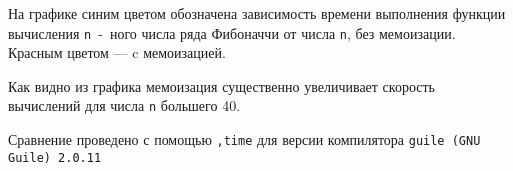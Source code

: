     На графике синим цветом обозначена зависимость времени выполнения функции вычисления \verb,n,~-~ного числа ряда Фибоначчи от числа \verb,n,, без мемоизации.
    Красным цветом --- c мемоизацией.

    Как видно из графика мемоизация существенно увеличивает скорость вычислений для числа \verb,n, большего 40.

    Сравнение проведено с помощью \verb;,time; для версии компилятора \verb,guile (GNU Guile) 2.0.11,
